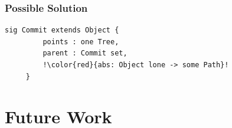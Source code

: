 \documentclass{beamer}
\begin{document}
\begin{frame}[fragile]
   \frametitle{Possible Solution}
      \footnotesize
      \begin{lstlisting}[escapechar=!]
      sig Commit extends Object {
         points : one Tree,
         parent : Commit set,
         !\color{red}{abs: Object lone -> some Path}!
     }
     \end{lstlisting}
\end{frame}

\section{Future Work}

\frame{
   \titlepage
}
\end{document}
